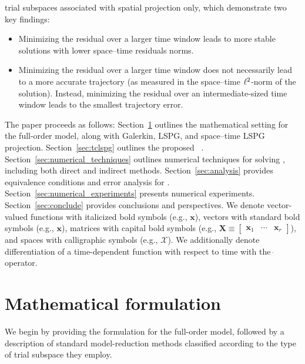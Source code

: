 \documentclass[3p,computermodern,10pt]{elsarticle}
\begin{document}
\begin{enumerate}
	trial subspaces associated with spatial projection only, which demonstrate two key findings:
\begin{itemize}
\item Minimizing the residual over a larger time window leads to more stable solutions 
with lower space--time residuals norms.
\item Minimizing the residual over a larger time window does not necessarily
	lead to a more accurate trajectory (as measured in the space--time
		$\ell^2$-norm of the solution). Instead, minimizing the residual over an
		intermediate-sized time window leads to the smallest trajectory error.
\end{itemize}
\end{enumerate}

The paper proceeds as follows: Section~\ref{sec:math}
outlines the mathematical setting for the full-order model, along with Galerkin, LSPG, and
space--time LSPG projection. Section~\ref{sec:tclspg} outlines the proposed \methodAcronym\
\approachKwd. Section~\ref{sec:numerical_techniques}
outlines numerical techniques for solving \methodAcronymROMs, including both direct and
indirect methods. Section~\ref{sec:analysis} provides
equivalence conditions and error analysis for \methodAcronymROMs.
Section~\ref{sec:numerical_experiments} presents numerical experiments.
Section~\ref{sec:conclude} provides conclusions and perspectives.
We denote vector-valued functions with italicized bold symbols (e.g., $\boldsymbol
x$), vectors with standard bold symbols (e.g., $\mathbf{x}$), 
matrices with capital bold symbols (e.g., $\mathbf{X} \equiv \begin{bmatrix}
\mathbf{x}_1 & \cdots & \mathbf{x}_r\end{bmatrix}$), and spaces with
calligraphic symbols (e.g., $\mathcal{X}$). We additionally denote differentiation of a time-dependent 
function with respect to time with the $\dot\ $ operator.
\section{Mathematical formulation}\label{sec:math}
	We begin by providing the formulation for the full-order model,
	followed by a description of standard model-reduction methods
	classified according to the type of trial subspace they employ.
\end{document}
